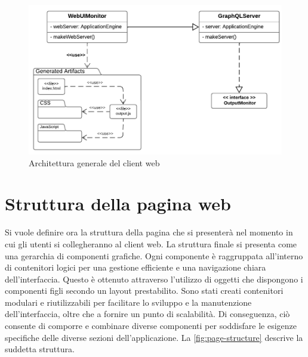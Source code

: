 \begin{figure}[htb]
	\centering
	\includegraphics[scale=0.7]{imgs/Web_Client_Structure.pdf}
	\caption{Architettura generale del client web}
	\label{fig:client-web-structure-graphics}
\end{figure}

\section{Struttura della pagina web} \label{section:page-structure}
Si vuole definire ora la struttura della pagina che si presenterà nel momento in cui gli utenti si collegheranno al client web. La struttura finale si presenta come una gerarchia di componenti grafiche. Ogni componente è raggruppata all'interno di contenitori logici per una gestione efficiente e una navigazione chiara dell'interfaccia. Questo è ottenuto attraverso l'utilizzo di oggetti che dispongono i componenti figli secondo un layout prestabilito. Sono stati creati contenitori modulari e riutilizzabili per facilitare lo sviluppo e la manutenzione dell'interfaccia, oltre che a fornire un punto di scalabilità. Di conseguenza, ciò consente di comporre e combinare diverse componenti per soddisfare le esigenze specifiche delle diverse sezioni dell'applicazione. La \cref{fig:page-structure} descrive la suddetta struttura.

